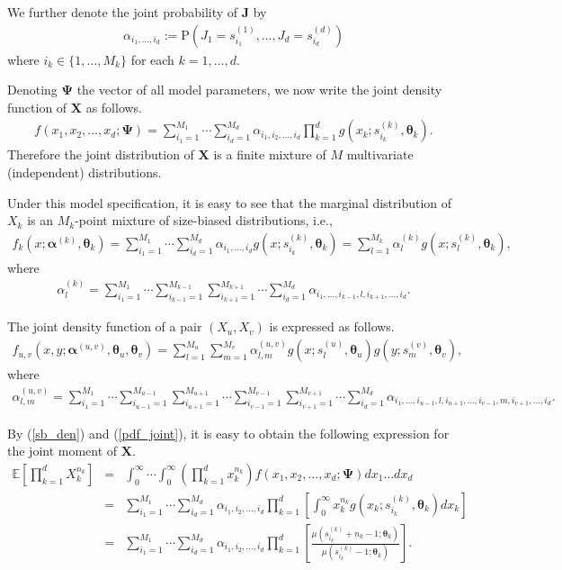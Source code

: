 \documentclass[11pt]{article}
\def\a{\alpha} \def\b{\beta}
\def\bea{\begin{eqnarray*}} \def\eea{\end{eqnarray*}}
\def\beq{\begin{eqnarray}} \def\eeq{\end{eqnarray}}
\def\nn{\nonumber}
\def\mE{\mathbb{E}}
\def\mP{\text{P}}
\begin{document}
We further denote the joint probability of $\bm{J}$ by
\bea
\a_{i_1,\ldots,i_d} := \mP\left(J_1 = s^{(1)}_{i_1}, \ldots, J_d = s^{(d)}_{i_d}\right) 
\eea
where $i_k \in \{1,\ldots, M_k\}$ for each $k = 1,\ldots, d$. 

Denoting $\bm{\Psi}$ the vector of all model parameters, we now write the joint density function of $\bm{X}$ as follows.
\beq\label{pdf_joint}
f(x_1,x_2,\ldots,x_d; \bm{\Psi}) = \sum_{i_1 = 1}^{M_1} \cdots\sum_{i_d = 1}^{M_d} \a_{i_1,i_2,\ldots,i_d} \prod_{k=1}^d g(x_k;s^{(k)}_{i_k}, \bm{\theta}_k). 
\eeq
Therefore the joint distribution of $\bm{X}$ is a finite mixture of $M$ multivariate (independent) distributions.   

Under this model specification, it is easy to see that the marginal distribution of $X_k$ is an $M_k$-point mixture of size-biased distributions, i.e., 
\beq\label{marginal_density}
f_k(x; \bm{\a}^{(k)}, \bm{\theta}_k) = \sum_{i_1 = 1}^{M_1} \cdots\sum_{i_d = 1}^{M_d} \a_{i_1,\ldots,i_d}g(x;s^{(k)}_{i_k},\bm{\theta}_k) =  \sum_{l = 1}^{M_k} \a^{(k)}_{l} g(x;s^{(k)}_{l},\bm{\theta}_k),      
\eeq
where
\bea
\a^{(k)}_{l} =  \sum_{i_1 = 1}^{M_1} \cdots \sum_{i_{k-1} = 1}^{M_{k-1}}\sum_{i_{k+1} = 1}^{M_{k+1}}\cdots \sum_{i_d = 1}^{M_d} \a_{i_1,\ldots,i_{k-1}, l, i_{k+1},\ldots, i_d}.
\eea

The joint density function of a pair $(X_u, X_v)$ is expressed as follows.
\beq\label{pair_density}
f_{u,v}(x, y; \bm{\a}^{(u,v)}, \bm{\theta}_u, \bm{\theta}_v) = \sum_{l = 1}^{M_u}\sum_{m = 1}^{M_v} \a^{(u,v)}_{l,m} g(x;s^{(u)}_{l},\bm{\theta}_u)g(y;s^{(v)}_{m},\bm{\theta}_v),      
\eeq
where
\bea
\a^{(u,v)}_{l,m} =  \sum_{i_1 = 1}^{M_1} \cdots \sum_{i_{u-1} = 1}^{M_{u-1}}\sum_{i_{u+1} = 1}^{M_{u+1}}\cdots \sum_{i_{v-1} = 1}^{M_{v-1}}\sum_{i_{v+1} = 1}^{M_{v+1}}\cdots \sum_{i_d = 1}^{M_d} \a_{i_1,\ldots,i_{u-1}, l, i_{u+1},\ldots, i_{v-1}, m, i_{v+1},\ldots, i_d}.
\eea

By (\ref{sb_den}) and (\ref{pdf_joint}), it is easy to obtain the following expression for the joint moment of $\bm{X}$.
\beq\label{joint_mom}\nn
\mE\left[\prod_{k=1}^d X_{k}^{n_k}\right] &=& \int_0^{\infty} \cdots \int_0^{\infty}\left(\prod_{k=1}^d x_{k}^{n_k}\right) f(x_1,x_2,\ldots,x_d; \bm{\Psi}) dx_1\ldots dx_d\\\nn
                               &=& \sum_{i_1 = 1}^{M_1} \cdots\sum_{i_d = 1}^{M_d} \a_{i_1,i_2,\ldots,i_d} \prod_{k=1}^d \left[\int_0^{\infty} x_k^{n_k}g(x_k;s^{(k)}_{i_k}, \bm{\theta}_k) dx_k\right]\\
															 &=& \sum_{i_1 = 1}^{M_1} \cdots\sum_{i_d = 1}^{M_d} \a_{i_1,i_2,\ldots,i_d} \prod_{k=1}^d \left[\frac{\mu(s^{(k)}_{i_k} + n_k -1;  \bm{\theta}_k)}{\mu(s^{(k)}_{i_k} -1;  \bm{\theta}_k)}\right].
\eeq
\end{document}

